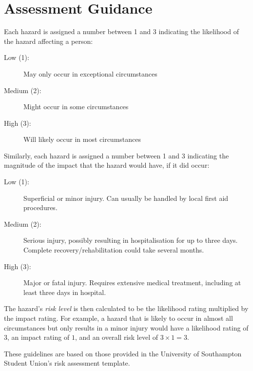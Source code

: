 \documentclass[a4paper,landscape]{article}
\begin{document}
\section*{Assessment Guidance}

Each hazard is assigned a number between 1 and 3 indicating the likelihood of
the hazard affecting a person:
\begin{description}
    \item[Low (1):] May only occur in exceptional circumstances
    \item[Medium (2):] Might occur in some circumstances
    \item[High (3):] Will likely occur in most circumstances
\end{description}

Similarly, each hazard is assigned a number between 1 and 3 indicating the
magnitude of the impact that the hazard would have, if it did occur:
\begin{description}
    \item[Low (1):] Superficial or minor injury. Can usually be handled by local
    first aid procedures.
    \item[Medium (2):] Serious injury, possibly resulting in hospitalisation for
    up to three days. Complete recovery/rehabilitation could take several months.
    \item[High (3):] Major or fatal injury. Requires extensive medical treatment,
    including at least three days in hospital.
\end{description}

The hazard's \emph{risk level} is then calculated to be the likelihood rating
multiplied by the impact rating. For example, a hazard that is likely to occur
in almost all circumstances but only results in a minor injury would have a
likelihood rating of $3$, an impact rating of $1$, and an overall risk level of
$3 \times 1 = 3$.

These guidelines are based on those provided in the University of Southampton
Student Union's risk assessment template.
\end{document}
